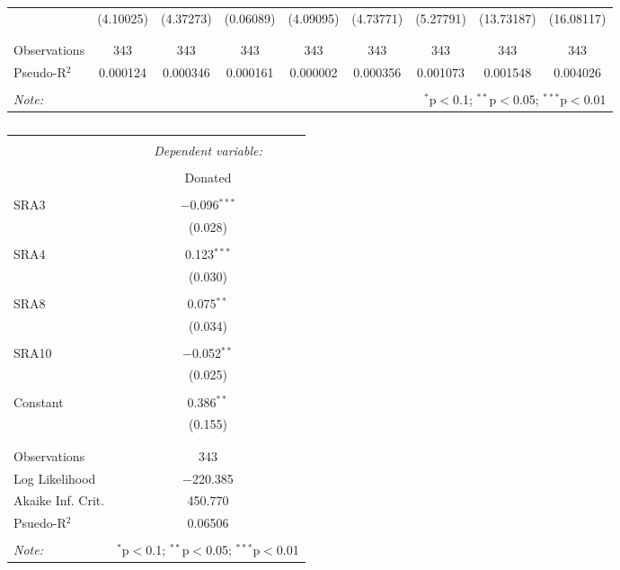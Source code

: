 \documentclass[12pt]{article}
\begin{document}
\begin{table}[!htbp]
\begin{adjustbox}{width=\textwidth}
\begin{tabular}{@{\extracolsep{5pt}}lcccccccc}
  & (4.10025) & (4.37273) & (0.06089) & (4.09095) & (4.73771) & (5.27791) & (13.73187) & (16.08117) \\ 
  & & & & & & & & \\ 
\hline \\[-1.8ex] 
Observations & 343 & 343 & 343 & 343 & 343 & 343 & 343 & 343 \\ 
Pseudo-R$^{2}$ & 0.000124 & 0.000346 & 0.000161 & 0.000002 & 0.000356 & 0.001073 & 0.001548 & 0.004026 \\
\hline 
\hline \\[-1.8ex] 
\textit{Note:}  & \multicolumn{8}{r}{$^{*}$p$<$0.1; $^{**}$p$<$0.05; $^{***}$p$<$0.01} \\ 
\end{tabular} 
\end{adjustbox}
\end{table} 




\begin{table}[!htbp] \centering 
  \caption{} 
  \label{} 
\begin{tabular}{@{\extracolsep{5pt}}lc} 
\\[-1.8ex]\hline 
\hline \\[-1.8ex] 
 & \multicolumn{1}{c}{\textit{Dependent variable:}} \\ 
\cline{2-2} 
\\[-1.8ex] & Donated \\ 
\hline \\[-1.8ex] 
 SRA3 & $-$0.096$^{***}$ \\ 
  & (0.028) \\ 
  & \\ 
 SRA4 & 0.123$^{***}$ \\ 
  & (0.030) \\ 
  & \\ 
 SRA8 & 0.075$^{**}$ \\ 
  & (0.034) \\ 
  & \\ 
 SRA10 & $-$0.052$^{**}$ \\ 
  & (0.025) \\ 
  & \\ 
 Constant & 0.386$^{**}$ \\ 
  & (0.155) \\ 
  & \\ 
\hline \\[-1.8ex] 
Observations & 343 \\ 
Log Likelihood & $-$220.385 \\ 
Akaike Inf. Crit. & 450.770 \\ 
Psuedo-R$^{2}$ & 0.06506 \\
\hline 
\hline \\[-1.8ex] 
\textit{Note:}  & \multicolumn{1}{r}{$^{*}$p$<$0.1; $^{**}$p$<$0.05; $^{***}$p$<$0.01} \\ 
\end{tabular} 
\end{table} 
\end{document}

